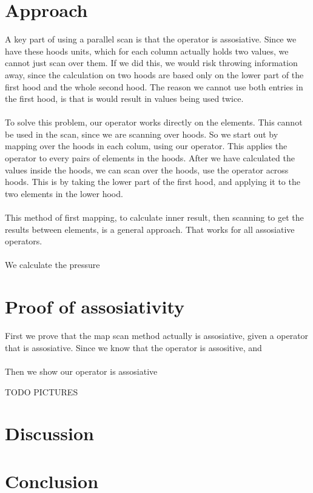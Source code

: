 \documentclass[11pt]{report}
\begin{document}
\section{Approach}
A key part of using a parallel scan is that the operator is assosiative. Since we have these hoods units, which for each column actually holds two values, we cannot just scan over them. If we did this, we would risk throwing information away, since the calculation on two hoods are based only on the lower part of the first hood and the whole second hood. The reason we cannot use both entries in the first hood, is that is would result in values being used twice.
\\
\\
To solve this problem, our operator works directly on the elements. This cannot be used in the scan, since we are scanning over hoods. So we start out by mapping over the hoods in each colum, using our operator. This applies the operator to every pairs of elements in the hoods. After we have calculated the values inside the hoods, we can scan over the hoods, use the operator across hoods. This is by taking the lower part of the first hood, and applying it to the two elements in the lower hood.
\\
\\
This method of first mapping, to calculate inner result, then scanning to get the results between elements, is a general approach. That works for all assosiative operators.
\\
\\
We calculate the pressure

\section{Proof of assosiativity}

First we prove that the map scan method actually is assosiative, given a operator that is assosiative. Since we know that the operator is assositive, and
\\
\\
Then we show our operator is assosiative

TODO PICTURES

\section{Discussion}

\section{Conclusion}
\end{document}
